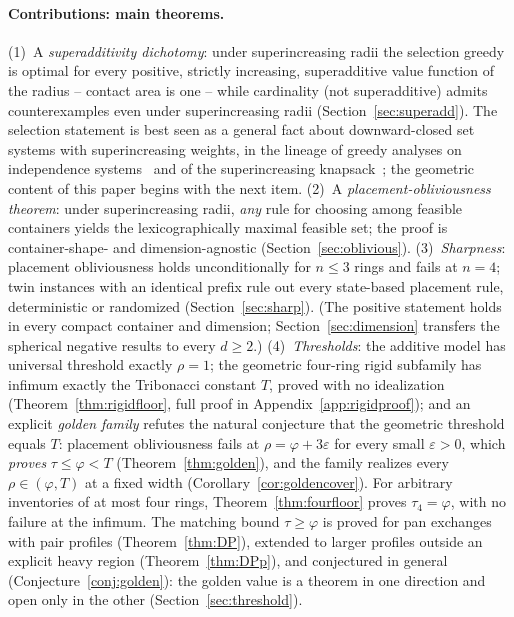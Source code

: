 \documentclass[11pt]{article}
\theoremstyle{definition}
\begin{document}
\paragraph{Contributions: main theorems.}
(1)~A \emph{superadditivity dichotomy}: under superincreasing radii the
selection greedy is optimal for every positive, strictly increasing,
superadditive value function of the radius -- contact area is one -- while
cardinality (not superadditive) admits counterexamples even under
superincreasing radii (Section~\ref{sec:superadd}). The selection statement
is best seen as a general fact about downward-closed set systems with
superincreasing weights, in the lineage of greedy analyses on independence
systems~\cite{Edmonds1971,KorteHausmann1978} and of the superincreasing
knapsack~\cite{Gupte2016}; the geometric content of this paper begins with
the next item.
(2)~A \emph{placement-obliviousness theorem}: under superincreasing radii,
\emph{any} rule for choosing among feasible containers yields the
lexicographically maximal feasible set; the proof is container-shape- and
dimension-agnostic (Section~\ref{sec:oblivious}).
(3)~\emph{Sharpness}: placement obliviousness holds unconditionally for
$n\le3$ rings and fails at $n=4$; twin instances with an identical prefix rule
out every state-based placement rule, deterministic or randomized
(Section~\ref{sec:sharp}).
(The positive statement holds in every compact container and dimension;
Section~\ref{sec:dimension} transfers the spherical negative results
to every $d\ge2$.)
(4)~\emph{Thresholds}: the additive model has universal threshold exactly
$\rho=1$; the geometric four-ring rigid subfamily has infimum exactly the
Tribonacci constant $T$, proved with no idealization
(Theorem~\ref{thm:rigidfloor}, full proof in
Appendix~\ref{app:rigidproof}); and an explicit \emph{golden family}
refutes the natural conjecture that the geometric threshold equals $T$:
placement obliviousness fails at $\rho=\varphi+3\varepsilon$ for every
small $\varepsilon>0$, which \emph{proves} $\tau\le\varphi<T$
(Theorem~\ref{thm:golden}), and the family realizes every
$\rho\in(\varphi,T)$ at a fixed width
(Corollary~\ref{cor:goldencover}). For arbitrary inventories of at most
four rings, Theorem~\ref{thm:fourfloor} proves $\tau_4=\varphi$,
with no failure at the infimum. The matching bound $\tau\ge\varphi$
is proved for pan exchanges with pair profiles
(Theorem~\ref{thm:DP}), extended to larger profiles outside an explicit
heavy region (Theorem~\ref{thm:DPp}), and conjectured in general
(Conjecture~\ref{conj:golden}): the golden value is a theorem in one
direction and open only in the other
(Section~\ref{sec:threshold}).
\end{document}
